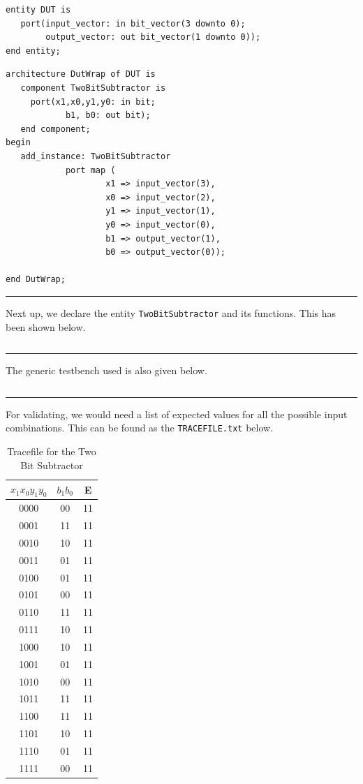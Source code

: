 \documentclass[a4paper, 11pt]{article}
\begin{document}
\begin{verbatim}
entity DUT is
   port(input_vector: in bit_vector(3 downto 0);
       	output_vector: out bit_vector(1 downto 0));
end entity;
\end{verbatim}

\begin{verbatim}
architecture DutWrap of DUT is
   component TwoBitSubtractor is
     port(x1,x0,y1,y0: in bit;
         	b1, b0: out bit);
   end component;
begin
   add_instance: TwoBitSubtractor 
			port map (
					x1 => input_vector(3),
					x0 => input_vector(2),
					y1 => input_vector(1),
					y0 => input_vector(0),
					b1 => output_vector(1),
					b0 => output_vector(0));

end DutWrap;
\end{verbatim}
\hrule
\vspace*{2mm}
Next up, we declare the entity \texttt{TwoBitSubtractor} and its functions. This has been shown below.

\inputminted[linenos]{vhdl}{Submission/TwoBitSubtractor/TwoBitSubtractor.vhd}

\hrule
\vspace*{2mm}
The generic testbench used is also given below.

\inputminted[linenos]{vhdl}{Submission/TwoBitSubtractor/Testbench.vhd}

\hrule
\vspace*{3mm}

For validating, we would need a list of expected values for all the possible input combinations. This can be found as the \texttt{TRACEFILE.txt} below.
\begin{table}[H]
\centering
\begin{tabular}{|c|c|c|}
\hline
$x_1x_0y_1y_0$ & $b_1b_0$ & E\\
\hline
0000 & 00  & 11 \\
0001 & 11  & 11\\
0010 & 10  & 11\\
0011 & 01  & 11\\
0100 & 01  & 11\\
0101 & 00  & 11\\
0110 & 11  & 11\\
0111 & 10  & 11\\
1000 & 10  & 11\\
1001 & 01  & 11\\
1010 & 00  & 11\\
1011 & 11  & 11\\
1100 & 11  & 11\\
1101 & 10  & 11\\
1110 & 01  & 11\\
1111 & 00  & 11\\
\hline
\end{tabular}
\caption{Tracefile for the Two Bit Subtractor}
\end{table}
\end{document}
